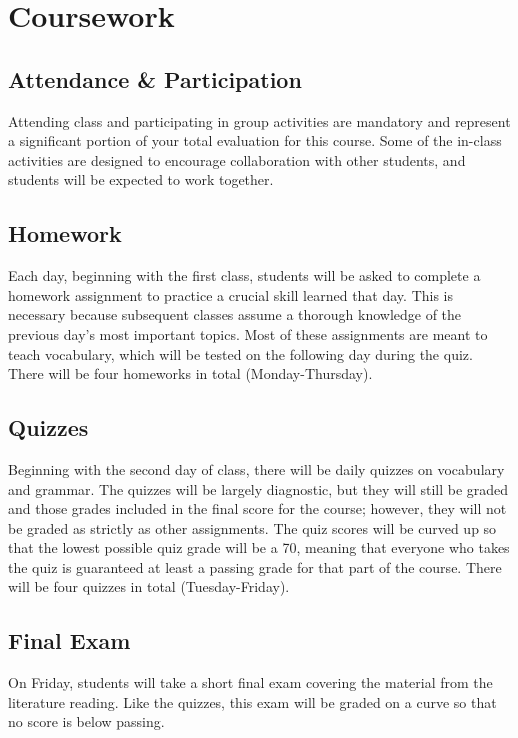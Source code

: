 \documentclass[11pt]{article}
\begin{document}
		
	\section*{Coursework}
		\subsection*{Attendance \& Participation}
			Attending class and participating in group activities are mandatory and represent a significant portion of your total evaluation for this course.
			Some of the in-class activities are designed to encourage collaboration with other students,
				and students will be expected to work together.
		
		\subsection*{Homework}
			Each day, beginning with the first class, students will be asked to complete a homework assignment to practice a crucial skill learned that day.
				This is necessary because subsequent classes assume a thorough knowledge of the previous day's most important topics.
				Most of these assignments are meant to teach vocabulary, which will be tested on the following day during the quiz.
			There will be four homeworks in total (Monday-Thursday).
			
		\subsection*{Quizzes}
			Beginning with the second day of class, there will be daily quizzes on vocabulary and grammar.
			The quizzes will be largely diagnostic, but they will still be graded and those grades included in the final score for the course;
				however, they will not be graded as strictly as other assignments.
			The quiz scores will be curved up so that the lowest possible quiz grade will be a 70, 
				meaning that everyone who takes the quiz is guaranteed at least a passing grade for that part of the course.
			There will be four quizzes in total (Tuesday-Friday).
			
		\subsection*{Final Exam}
			On Friday, students will take a short final exam covering the material from the literature reading.
			Like the quizzes, this exam will be graded on a curve so that no score is below passing.
			
\end{document}
